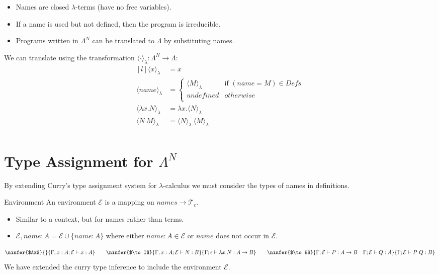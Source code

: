 \begin{itemize}
    \item Names are closed $\lambda$-terms (have no free variables).
    \item If a name is used but not defined, then the program is irreducible.
    \item Programs written in $\Lambda^N$ can be translated to $\Lambda$ by substituting names.
\end{itemize}
We can translate using the transformation $\langle \cdot \rangle_\lambda : \Lambda^N \to \Lambda$:
\[\begin{matrix*}[l]
    \langle x \rangle_\lambda & = x \\
    \langle name \rangle_\lambda & = \begin{cases}
        \langle M \rangle_\lambda & \text{if } (name = M) \in Defs \\
        undefined & otherwise \\
    \end{cases} \\
    \langle \lambda x . N \rangle_\lambda & = \lambda x . \langle N \rangle_\lambda \\
    \langle  N \ M \rangle_\lambda & = \langle N \rangle_\lambda \ \langle M \rangle_\lambda \\
\end{matrix*}\]

\section{Type Assignment for $\Lambda^N$}
By extending Curry's type assignment system for $\lambda$-calculus we must consider the types of names in definitions.
\begin{definitionbox}{Environment}
    An environment $\mathcal{E}$ is a mapping on $names \to \mathcal{T}_c$.
    \begin{itemize}
        \item Similar to a context, but for names rather than terms.
        \item $\mathcal{E}, name:A = \mathcal{E} \cup \{ name: A \}$ where either $name : A \in \mathcal{E}$ or $name$ does not occur in $\mathcal{E}$.
    \end{itemize}
\end{definitionbox}

\[\ninfer{$Ax$}{}{\Gamma, x:A; \mathcal{E} \vdash x : A} 
\qquad \ninfer{$\to I$}{\Gamma, x:A ; \mathcal{E} \vdash N : B}{\Gamma ; \epsilon \vdash \lambda x . N : A \to B}
\qquad \ninfer{$\to E$}{\Gamma; \mathcal{E} \vdash P : A \to B \quad \Gamma ; \mathcal{E} \vdash Q : A}{\Gamma ; \mathcal{E} \vdash P \ Q : B}\]
We have extended the curry type inference to include the environment $\mathcal{E}$.

